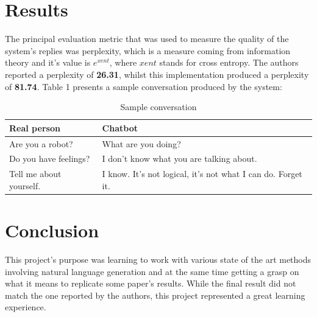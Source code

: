 \documentclass{article}
\begin{document}
\section{Results}

The principal evaluation metric that was used to measure the quality of the system's replies was perplexity, which is a measure coming from information theory and it's value is \(e^{xent}\), where \(xent\) stands for cross entropy. The authors reported a perplexity of \textbf{26.31}, whilst this implementation produced a perplexity of \textbf{81.74}. Table 1 presents a sample conversation produced by the system:

\begin{center}
  \begin{table}[h]
  \caption{Sample conversation}
  \begin{tabular}{ | m{6.5cm} | m{6.5cm} |}
    \hline
    Real person & Chatbot \\ \hline
    Are you a robot? & What are you doing? \\
    Do you have feelings? & I don't know what you are talking about. \\
    Tell me about yourself. & I know. It's not logical, it's not what I can do. Forget it. \\
    \hline
  \end{tabular}
  \end{table}
\end{center}

\section{Conclusion}
This project's purpose was learning to work with various state of the art methods involving natural language generation and at the same time getting a grasp on what it means to replicate some paper's results. While the final result did not match the one reported by the authors, this project represented a great learning experience.



\end{document}
